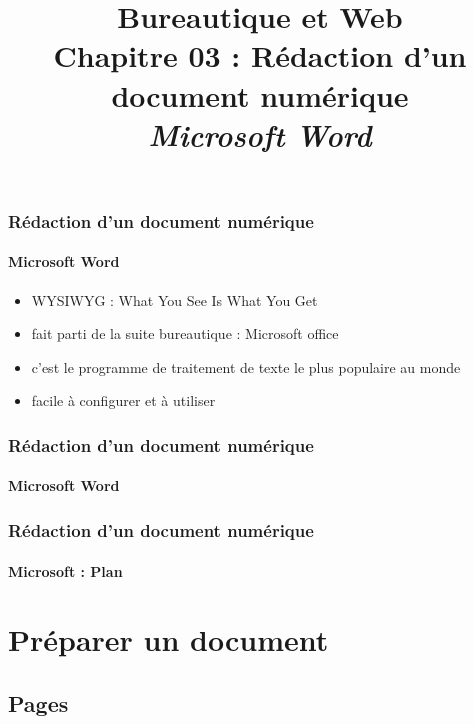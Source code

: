 \documentclass[xcolor=table]{beamer}
\title[BWEB : 03- Rédaction (Microsoft Word)] %
{Bureautique et Web \\Chapitre 03 : Rédaction d'un document numérique \\ \slshape\small  Microsoft Word}
\begin{document}
\begin{frame}
\frametitle{Rédaction d'un document numérique}
\framesubtitle{Microsoft Word}

\begin{itemize}
	\item WYSIWYG : What You See Is What You Get
	\item fait parti de la suite bureautique : Microsoft office
	\item c'est le programme de traitement de texte le plus populaire au monde
	\item facile à configurer et à utiliser 
\end{itemize}

\end{frame}

\begin{frame}
\frametitle{Rédaction d'un document numérique}
\framesubtitle{Microsoft Word}

\begin{center}
\end{center}

\end{frame}

\begin{frame}
\frametitle{Rédaction d'un document numérique}
\framesubtitle{Microsoft : Plan}

\begin{multicols}{2}
	\tableofcontents
\end{multicols}
\end{frame}

\section{Préparer un document}

%

\subsection{Pages}
\end{document}
